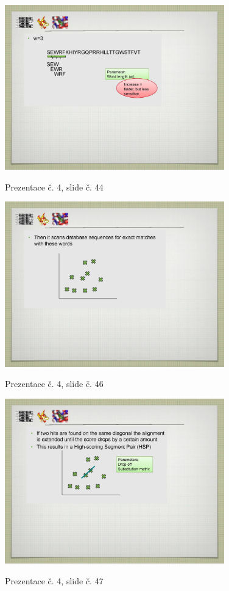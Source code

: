 \documentclass[DIV=8]{scrreprt}
\begin{document}
\begin{figure}
    \caption{Prezentace č. 4, slide č. 44}
    \includegraphics[width=0.85\textwidth]{slides-4/slide-44.jpg}
    \centering
    \label{slides-4-slide-44}
\end{figure}
\begin{figure}
    \caption{Prezentace č. 4, slide č. 46}
    \includegraphics[width=0.85\textwidth]{slides-4/slide-46.jpg}
    \centering
    \label{slides-4-slide-46}
\end{figure}
\begin{figure}
    \caption{Prezentace č. 4, slide č. 47}
    \includegraphics[width=0.85\textwidth]{slides-4/slide-47.jpg}
    \centering
    \label{slides-4-slide-47}
\end{figure}
\end{document}
